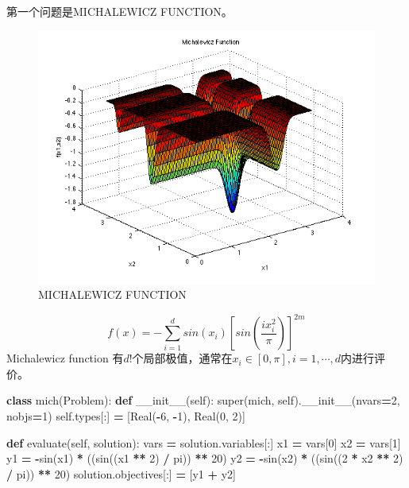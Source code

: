 \documentclass[]{ctexbook}
\newenvironment{Shaded}{\begin{snugshade}}{\end{snugshade}}
\newcommand{\KeywordTok}[1]{\textcolor[rgb]{0.13,0.29,0.53}{\textbf{#1}}}
\newcommand{\DecValTok}[1]{\textcolor[rgb]{0.00,0.00,0.81}{#1}}
\newcommand{\FunctionTok}[1]{\textcolor[rgb]{0.00,0.00,0.00}{#1}}
\newcommand{\VariableTok}[1]{\textcolor[rgb]{0.00,0.00,0.00}{#1}}
\newcommand{\OperatorTok}[1]{\textcolor[rgb]{0.81,0.36,0.00}{\textbf{#1}}}
\newcommand{\BuiltInTok}[1]{#1}
\newcommand{\NormalTok}[1]{#1}
\begin{document}
第一个问题是MICHALEWICZ FUNCTION。

\begin{figure}

{\centering \includegraphics[width=0.7\linewidth]{img/python2} 

}

\caption{MICHALEWICZ FUNCTION}\label{fig:python2}
\end{figure}

\[
f(x)=-\sum_{i=1}^{d}sin(x_i)[sin(\frac{ix_i^2}{\pi})]^{2m}
\] Michalewicz function
有\(d!\)个局部极值，通常在\(x_i\in[0,\pi],i=1,\cdots,d\)内进行评价。

\begin{Shaded}
\begin{Highlighting}[]
\KeywordTok{class}\NormalTok{ mich(Problem):}
    \KeywordTok{def} \FunctionTok{__init__}\NormalTok{(}\VariableTok{self}\NormalTok{):}
        \BuiltInTok{super}\NormalTok{(mich, }\VariableTok{self}\NormalTok{).}\FunctionTok{__init__}\NormalTok{(nvars}\OperatorTok{=}\DecValTok{2}\NormalTok{, nobjs}\OperatorTok{=}\DecValTok{1}\NormalTok{)}
        \VariableTok{self}\NormalTok{.types[:] }\OperatorTok{=}\NormalTok{ [Real(}\OperatorTok{-}\DecValTok{6}\NormalTok{, }\OperatorTok{-}\DecValTok{1}\NormalTok{), Real(}\DecValTok{0}\NormalTok{, }\DecValTok{2}\NormalTok{)]}

    \KeywordTok{def}\NormalTok{ evaluate(}\VariableTok{self}\NormalTok{, solution):}
        \BuiltInTok{vars} \OperatorTok{=}\NormalTok{ solution.variables[:]}
\NormalTok{        x1 }\OperatorTok{=} \BuiltInTok{vars}\NormalTok{[}\DecValTok{0}\NormalTok{]}
\NormalTok{        x2 }\OperatorTok{=} \BuiltInTok{vars}\NormalTok{[}\DecValTok{1}\NormalTok{]}
\NormalTok{        y1 }\OperatorTok{=} \OperatorTok{-}\NormalTok{sin(x1) }\OperatorTok{*}\NormalTok{ ((sin((x1 }\OperatorTok{**} \DecValTok{2}\NormalTok{) }\OperatorTok{/}\NormalTok{ pi)) }\OperatorTok{**} \DecValTok{20}\NormalTok{)}
\NormalTok{        y2 }\OperatorTok{=} \OperatorTok{-}\NormalTok{sin(x2) }\OperatorTok{*}\NormalTok{ ((sin((}\DecValTok{2} \OperatorTok{*}\NormalTok{ x2 }\OperatorTok{**} \DecValTok{2}\NormalTok{) }\OperatorTok{/}\NormalTok{ pi)) }\OperatorTok{**} \DecValTok{20}\NormalTok{)}
\NormalTok{        solution.objectives[:] }\OperatorTok{=}\NormalTok{ [y1 }\OperatorTok{+}\NormalTok{ y2]}
\end{Highlighting}
\end{Shaded}
\end{document}
